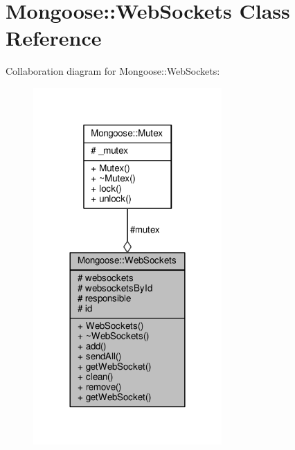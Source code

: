 \hypertarget{classMongoose_1_1WebSockets}{}\section{Mongoose\+:\+:Web\+Sockets Class Reference}
\label{classMongoose_1_1WebSockets}


Collaboration diagram for Mongoose\+:\+:Web\+Sockets\+:
\nopagebreak
\begin{figure}[H]
\begin{center}
\leavevmode
\includegraphics[width=204pt]{d6/d42/classMongoose_1_1WebSockets__coll__graph}
\end{center}
\end{figure}
